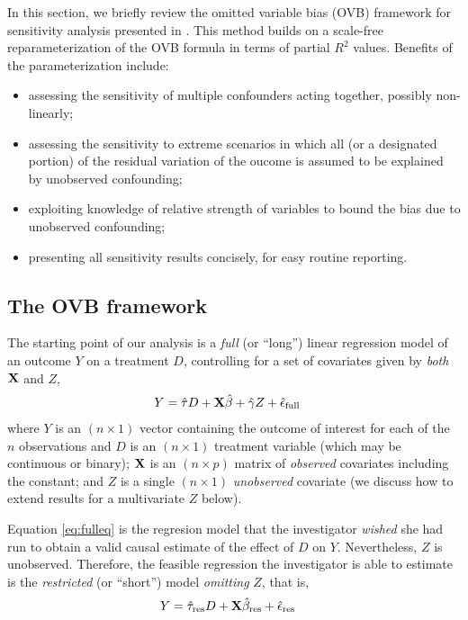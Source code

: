 \documentclass[
]{jss}
\providecommand{\tightlist}{%
  \setlength{\itemsep}{0pt}\setlength{\parskip}{0pt}}
\begin{document}
In this section, we briefly review the omitted variable bias (OVB)
framework for sensitivity analysis presented in
\citet{cinelli:jrssb2019}. This method builds on a scale-free
reparameterization of the OVB formula in terms of partial \(R^2\)
values. Benefits of the parameterization include:

\begin{itemize}
\tightlist
\item
  assessing the sensitivity of multiple confounders acting together,
  possibly non-linearly;
\item
  assessing the sensitivity to extreme scenarios in which all (or a
  designated portion) of the residual variation of the oucome is assumed
  to be explained by unobserved confounding;
\item
  exploiting knowledge of relative strength of variables to bound the
  bias due to unobserved confounding;
\item
  presenting all sensitivity results concisely, for easy routine
  reporting.
\end{itemize}

\hypertarget{ovb}{%
\subsection{The OVB framework}\label{ovb}}

The starting point of our analysis is a \emph{full} (or ``long'') linear
regression model of an outcome \(Y\) on a treatment \(D\), controlling
for a set of covariates given by \emph{both} \({\bf X}\) and \(Z\),
\begin{align}
Y &= \hat{\tau} D + {\bf X} \hat{{\bf \beta}} +  \hat{\gamma}Z + \hat{\epsilon}_{\text{full}}  \label{eq:fulleq}
\end{align} \noindent where \(Y\) is an \((n \times 1)\) vector
containing the outcome of interest for each of the \(n\) observations
and \(D\) is an \((n \times 1)\) treatment variable (which may be
continuous or binary); \({\bf X}\) is an \((n \times p)\) matrix of
\emph{observed} covariates including the constant; and \(Z\) is a single
\((n \times 1)\) \emph{unobserved} covariate (we discuss how to extend
results for a multivariate \(Z\) below).

Equation \ref{eq:fulleq} is the regresion model that the investigator
\emph{wished} she had run to obtain a valid causal estimate of the
effect of \(D\) on \(Y\). Nevertheless, \(Z\) is unobserved. Therefore,
the feasible regression the investigator is able to estimate is the
\emph{restricted} (or ``short'') model \emph{omitting} \(Z\), that is,
\begin{align}
Y  &= \hat{\tau}_{\text{res}} D + {\bf X} \hat{{\bf \beta}}_{\text{res}} + \hat{\epsilon}_{\text{res}}\label{eq:restrictedeq}
\end{align}
\end{document}
